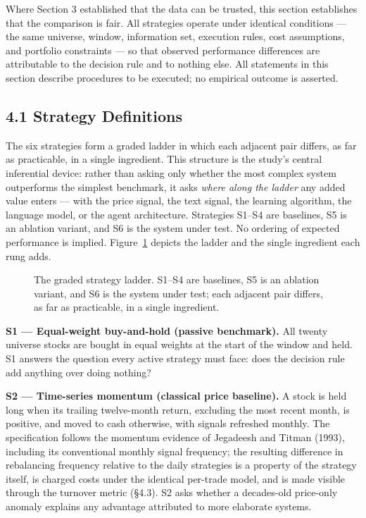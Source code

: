 \documentclass[
  12pt,
]{article}
\begin{document}
Where Section 3 established that the data can be trusted, this section
establishes that the comparison is fair. All strategies operate under
identical conditions --- the same universe, window, information set,
execution rules, cost assumptions, and portfolio constraints --- so that
observed performance differences are attributable to the decision rule
and to nothing else. All statements in this section describe procedures
to be executed; no empirical outcome is asserted.

\hypertarget{strategy-definitions}{%
\subsection{4.1 Strategy Definitions}\label{strategy-definitions}}

The six strategies form a graded ladder in which each adjacent pair
differs, as far as practicable, in a single ingredient. This structure
is the study's central inferential device: rather than asking only
whether the most complex system outperforms the simplest benchmark, it
asks \emph{where along the ladder} any added value enters --- with the
price signal, the text signal, the learning algorithm, the language
model, or the agent architecture. Strategies S1--S4 are baselines, S5 is
an ablation variant, and S6 is the system under test. No ordering of
expected performance is implied. Figure~\ref{fig:ladder} depicts the ladder and the single ingredient each rung adds.

\begin{figure}[htbp]
\centering

\caption{The graded strategy ladder. S1–S4 are baselines, S5 is an ablation variant, and S6 is the system under test; each adjacent pair differs, as far as practicable, in a single ingredient.}
\label{fig:ladder}
\end{figure}



\textbf{S1 --- Equal-weight buy-and-hold (passive benchmark).} All
twenty universe stocks are bought in equal weights at the start of the
window and held. S1 answers the question every active strategy must
face: does the decision rule add anything over doing nothing?

\textbf{S2 --- Time-series momentum (classical price baseline).} A stock
is held long when its trailing twelve-month return, excluding the most
recent month, is positive, and moved to cash otherwise, with signals
refreshed monthly. The specification follows the momentum evidence of
Jegadeesh and Titman (1993), including its conventional monthly signal
frequency; the resulting difference in rebalancing frequency relative to
the daily strategies is a property of the strategy itself, is charged
costs under the identical per-trade model, and is made visible through
the turnover metric (§4.3). S2 asks whether a decades-old price-only
anomaly explains any advantage attributed to more elaborate systems.
\end{document}
